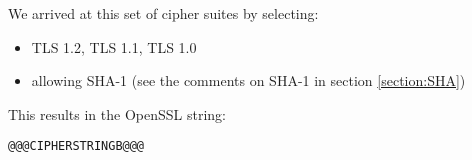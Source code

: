 We arrived at this set of cipher suites by selecting:

\begin{itemize}
\item TLS 1.2, TLS 1.1, TLS 1.0
\item allowing SHA-1 (see the comments on SHA-1 in section \ref{section:SHA})


\end{itemize}

This results in the OpenSSL string:

\begin{lstlisting}[breaklines]
@@@CIPHERSTRINGB@@@
\end{lstlisting}

